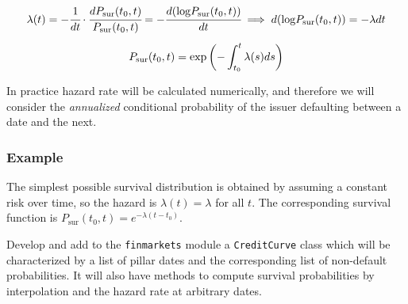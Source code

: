 
\begin{equation}
\begin{gathered}
\lambda(t) = -\cfrac{1}{dt}\cdot\cfrac{dP_{\textrm{sur}}(t_0, t)}{P_{\textrm{sur}}(t_0, t)} = -\cfrac{d(\textrm{log}P_{\textrm{sur}}(t_0, t))}{dt} \implies d(\textrm{log}P_{\textrm{sur}}(t_0, t)) = -\lambda dt\\[5pt]
P_{\textrm{sur}}(t_0, t) = \mathrm{exp}\left(-\int_{t_0}^{t}\lambda(s) ds\right)
\end{gathered}
\end{equation}

In practice hazard rate will be calculated numerically, and therefore we will consider the \emph{annualized} conditional probability of the issuer defaulting between a date and the next.

\subsubsection{Example}
The simplest possible survival distribution is obtained by assuming a constant risk over time, so the hazard is $\lambda (t)=\lambda$ for all $t$. The corresponding survival function is $P_{\textrm{sur}}(t_0, t) = e^{−\lambda (t-t_0)}$.

\begin{finmarkets}
Develop and add to the \texttt{finmarkets} module a \texttt{CreditCurve} class which will be characterized by a list of pillar dates and the corresponding list of non-default probabilities. It will also have methods to compute survival probabilities by interpolation and the hazard rate at arbitrary dates.
\end{finmarkets}
  
